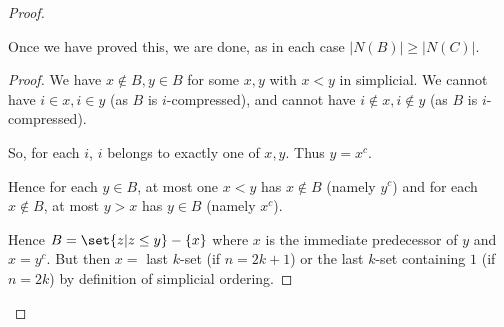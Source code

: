 \documentclass{article}
\begin{document}
\begin{proof}
\begin{center}
  \end{center}
  Once we have proved this, we are done, as in each case $|N(B)| \geq |N(C)|$.
  \begin{proof}
    We have $x \notin B, y \in B$ for some $x,y$ with $x<y$ in simplicial.
    We cannot have $i \in x, i \in y$ (as $B$ is $i$-compressed), and cannot have $i \notin x, i \notin y$ (as $B$ is $i$-compressed).

    So, for each $i$, $i$ belongs to exactly one of $x,y$.
    Thus $y = x^c$.

    Hence for each $y \in B$, at most one $x < y$ has $x \notin B$ (namely $y^c$) and for each $x \notin B$, at most $y > x$ has $y \in B$ (namely $x^c$).

    Hence $B = \set{z | z \leq y} - \{x\}$ where $x$ is the immediate predecessor of $y$ and $x = y^c$.
    But then $x=$ last $k$-set (if $n=2k+1$) or the last $k$-set containing $1$ (if $n = 2k$)
    by definition of simplicial ordering.
  \end{proof}
\end{proof}
\end{document}
